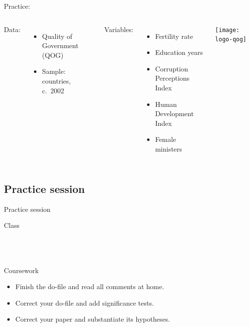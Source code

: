 \documentclass[t]{beamer}
\begin{document}
	\begin{frame}[t]{Practice: }

		\begin{columns}[c]

	    Data:\\[.5em]

			\begin{itemize}
				\item Quality of Government (QOG)
				\item Sample: countries, c.~2002
			\end{itemize}
		
			\vspace{.75em}
		
	    Variables:\\[.5em]
		
			\begin{itemize}
				\item Fertility rate
				\item Education years
				\item Corruption Perceptions Index
				\item Human Development Index
				\item Female ministers
			\end{itemize}
	

			\texttt{[image: logo-qog]}

		\end{columns}
	
	\end{frame}
	
	\subsection{Practice session}
  
	\begin{frame}[t]{Practice session}

    \begin{block}{Class}
      \\
      \\
      
			\\
			\\    
    \end{block}

    \begin{alertblock}{Coursework}
      \begin{itemize}
	      \item Finish the do-file and read all comments at home.
	      \item Correct your do-file and add significance tests.
	      \item Correct your paper and substantiate its hypotheses.
      \end{itemize}
    \end{alertblock}
    		
	\end{frame}
	
\end{document}
